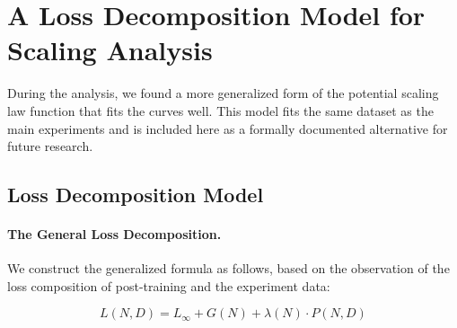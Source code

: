 \section{A Loss Decomposition Model for Scaling Analysis}

During the analysis, we found a more generalized form of the potential scaling law function that fits the curves well.
This model fits the same dataset as the main experiments and is included here as a formally documented alternative for future research.

\subsection{Loss Decomposition Model}

\paragraph{The General Loss Decomposition.}
We construct the generalized formula as follows, based on the observation of the loss composition of post-training and the experiment data:

\begin{equation}
\label{eq:v3}
    L(N,D)
    = L_{\infty} 
    + G(N)
    + \lambda(N)
    \cdot P(N, D)
\end{equation}

